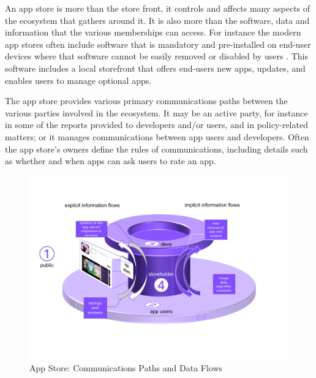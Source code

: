 An app store is more than the store front, it controls and affects many aspects of the ecosystem that gathers around it. It is also more than the software, data and information that the various memberships can access. For instance the modern app stores often include software that is mandatory and pre-installed on end-user devices where that software cannot be easily removed or disabled by users . This software includes a local storefront that offers end-users new apps, updates, and enables users to manage optional apps.

The app store provides various primary communications paths between the various parties involved in the ecosystem. It may be an active party, for instance in some of the reports provided to developers and/or users, and in policy-related matters; or it manages communications between app users and developers. Often the app store's owners define the rules of communications, including details such as whether and when apps can ask users to rate an app.

\begin{figure}
    \includegraphics[width=\linewidth]{images/my/app-store-data-flows-3d.pdf}
    \caption{App Store: Communications Paths and Data Flows}
    \label{fig:app-store-data-flows}
\end{figure}

